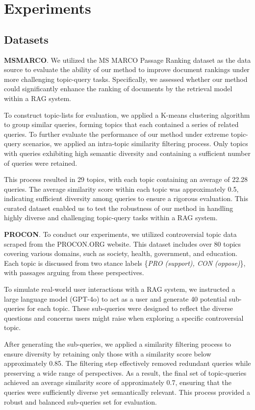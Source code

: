 
\section{Experiments}

\subsection{Datasets}

\textbf{MSMARCO}.
We utilized the MS MARCO Passage Ranking dataset as the data source to evaluate the ability of our method to improve document rankings under more challenging topic-query tasks. Specifically, we assessed whether our method could significantly enhance the ranking of documents by the retrieval model within a RAG system.

To construct topic-lists for evaluation, we applied a K-means clustering algorithm to group similar queries, forming topics that each contained a series of related queries. To further evaluate the performance of our method under extreme topic-query scenarios, we applied an intra-topic similarity filtering process. Only topics with queries exhibiting high semantic diversity and containing a sufficient number of queries were retained.

This process resulted in 29 topics, with each topic containing an average of 22.28 queries. The average similarity score within each topic was approximately 0.5, indicating sufficient diversity among queries to ensure a rigorous evaluation. This curated dataset enabled us to test the robustness of our method in handling highly diverse and challenging topic-query tasks within a RAG system.

\textbf{PROCON}.
To conduct our experiments, we utilized controversial topic data scraped from the PROCON.ORG website. This dataset includes over 80 topics covering various domains, such as society, health, government, and education. Each topic is discussed from two stance labels \{\textit{PRO (support), CON (oppose)}\}, with passages arguing from these perspectives.

To simulate real-world user interactions with a RAG system, we instructed a large language model (GPT-4o) to act as a user and generate 40 potential sub-queries for each topic. These sub-queries were designed to reflect the diverse questions and concerns users might raise when exploring a specific controversial topic. 

After generating the sub-queries, we applied a similarity filtering process to ensure diversity by retaining only those with a similarity score below approximately 0.85. The filtering step effectively removed redundant queries while preserving a wide range of perspectives. As a result, the final set of topic-queries achieved an average similarity score of approximately 0.7, ensuring that the queries were sufficiently diverse yet semantically relevant. This process provided a robust and balanced sub-queries set for evaluation.


